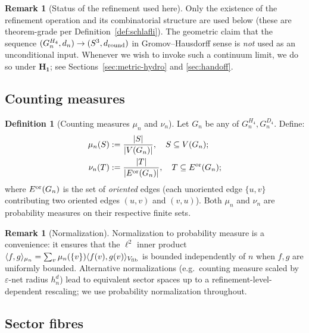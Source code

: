 \documentclass[11pt, a4paper]{amsart}
\theoremstyle{definition}
\newtheorem{definition}[theorem]{Definition}
\newtheorem{remark}[theorem]{Remark}
\begin{document}
\begin{remark}[Status of the refinement used here]
\label{rmk:refinement-status}
Only the existence of the refinement operation and its
combinatorial structure are used below (these are
theorem-grade per Definition~\ref{def:schlafli}). The geometric
claim that the sequence $(G_n^{H_4}, d_n) \to (S^3, d_{\rm round})$
in Gromov--Hausdorff sense is \emph{not} used as an unconditional
input. Whenever we wish to invoke such a continuum limit, we do so
under $\mathbf{H_1}$; see Sections~\ref{sec:metric-hydro}
and \ref{sec:handoff}.
\end{remark}

\subsection{Counting measures}
\label{subsec:counting-measures}

\begin{definition}[Counting measures $\mu_n$ and $\nu_n$]
\label{def:measures}
Let $G_n$ be any of $G_n^{H_4}, G_n^{D_4}$. Define:
\begin{align*}
  \mu_n(S) &:= \frac{|S|}{|V(G_n)|}, \quad S \subseteq V(G_n);
  \\
  \nu_n(T) &:= \frac{|T|}{|E^{\rm or}(G_n)|}, \quad T \subseteq E^{\rm or}(G_n);
\end{align*}
where $E^{\rm or}(G_n)$ is the set of \emph{oriented} edges
(each unoriented edge $\{u, v\}$ contributing two oriented edges
$(u, v)$ and $(v, u)$). Both $\mu_n$ and $\nu_n$ are probability
measures on their respective finite sets.
\end{definition}

\begin{remark}[Normalization]
Normalization to probability measure is a convenience: it ensures
that the $\ell^2$ inner product
$\langle f, g\rangle_{\mu_n} = \sum_v \mu_n(\{v\}) \langle f(v),
g(v)\rangle_{V_{\rm fib}}$ is bounded independently of $n$ when
$f, g$ are uniformly bounded. Alternative normalizations (e.g.\
counting measure scaled by $\varepsilon$-net radius $h_n^d$) lead
to equivalent sector spaces up to a refinement-level-dependent
rescaling; we use probability normalization throughout.
\end{remark}

\subsection{Sector fibres}
\label{subsec:fibres}
\end{document}
